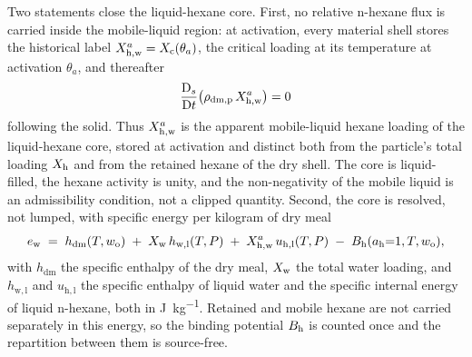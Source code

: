 Two statements close the liquid-hexane core. First, no relative n-hexane flux is carried inside
the mobile-liquid region: at activation, every material shell stores the
historical label $X_{\mathrm{h,w}}^{a} = X_{\mathrm{c}}(\theta_{a})$, the critical loading at its
temperature at activation $\theta_{a}$, and thereafter
\begin{equation}
\frac{\mathrm{D}_{s}}{\mathrm{D}t}\!\left(\rho_{\mathrm{dm,p}}\,X_{\mathrm{h,w}}^{a}\right) = 0
\label{eq:shellconserved}
\end{equation}
following the solid. Thus $X_{\mathrm{h,w}}^{a}$ is the apparent mobile-liquid hexane
loading of the liquid-hexane core, stored at activation and distinct both from the
particle's total loading $X_{\mathrm{h}}$ and from the retained hexane of the dry
shell. The core is liquid-filled, the hexane activity is unity,
and the non-negativity of the mobile liquid is an admissibility condition, not
a clipped quantity. Second, the core is resolved, not lumped, with specific energy
per kilogram of dry meal
\begin{equation}
e_{\mathrm{w}} \;=\; h_{\mathrm{dm}}(T,w_{\mathrm{o}})
 \;+\; X_{\mathrm{w}}\, h_{\mathrm{w,l}}(T,P)
 \;+\; X_{\mathrm{h,w}}^{a}\, u_{\mathrm{h,l}}(T,P)
 \;-\; B_{\mathrm{h}}(a_{\mathrm{h}}{=}1,T,w_{\mathrm{o}}),
\label{eq:wetenergy}
\end{equation}
with $h_{\mathrm{dm}}$ the specific enthalpy of the dry meal, $X_{\mathrm{w}}$ the total
water loading, and $h_{\mathrm{w,l}}$ and $u_{\mathrm{h,l}}$ the specific
enthalpy of liquid water and the specific internal energy of liquid n-hexane,
both in \si{\joule\per\kilogram}. Retained and mobile hexane are not
carried separately in this energy, so the binding
potential $B_{\mathrm{h}}$ is counted once and the repartition between them is source-free.

